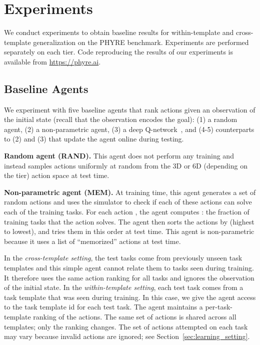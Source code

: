 \documentclass{article}
\begin{document}
\section{Experiments}
\label{sec:experiments}
We conduct experiments to obtain baseline results for within-template and cross-template generalization on the PHYRE benchmark. Experiments are performed separately on each tier. Code reproducing the results of our experiments is available from \url{https://phyre.ai}.

\subsection{Baseline Agents}
We experiment with five baseline agents that rank actions given an observation of the initial state (recall that the observation encodes the goal): (1) a random agent, (2) a non-parametric agent, (3) a deep Q-network~\cite{mnih2015atari}, and (4-5) counterparts to (2) and (3) that update the agent online during testing.

\noindent\textbf{Random agent (RAND).} This agent does not perform any training and instead samples actions uniformly at random from the 3D or 6D (depending on the tier) action space at test time.

\noindent\textbf{Non-parametric agent (MEM).} At training time, this agent generates a set of  random actions and uses the simulator to check if each of these actions can solve each of the training tasks. For each action , the agent computes : the fraction of training tasks that the action solves. The agent then sorts the  actions by  (highest to lowest), and tries them in this order at test time. This agent is non-parametric because it uses a list of ``memorized'' actions at test time.

In the \emph{cross-template setting}, the test tasks come from previously unseen task templates and this simple agent cannot relate them to tasks seen during training. It therefore uses the same action ranking for all tasks and ignores the observation of the initial state. In the \emph{within-template setting}, each test task comes from a task template that was seen during training. In this case, we give the agent access to the task template id for each test task. The agent maintains a per-task-template ranking of the  actions. The same set of actions is shared across all templates; only the ranking changes. The set of actions attempted on each task may vary because invalid actions are ignored; see Section~\ref{sec:learning_setting}.
\end{document}
